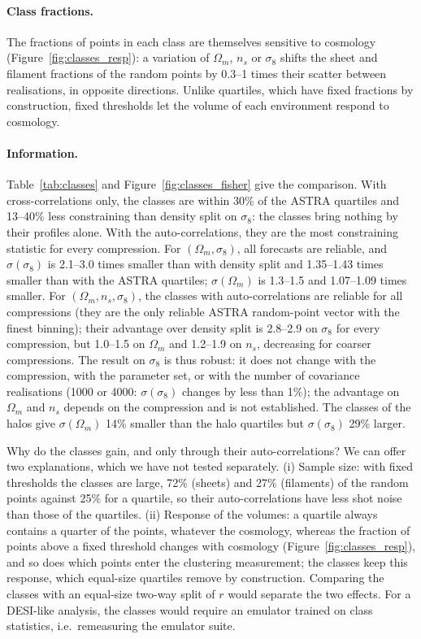 \paragraph{Class fractions.} The fractions of points in each class are themselves sensitive to cosmology (Figure~\ref{fig:classes_resp}): a variation of $\Omega_m$, $n_s$ or $\sigma_8$ shifts the sheet and filament fractions of the random points by 0.3--1 times their scatter between realisations, in opposite directions. Unlike quartiles, which have fixed fractions by construction, fixed thresholds let the volume of each environment respond to cosmology.

\paragraph{Information.} Table~\ref{tab:classes} and Figure~\ref{fig:classes_fisher} give the comparison. With cross-correlations only, the classes are within 30\% of the ASTRA quartiles and 13--40\% less constraining than density split on $\sigma_8$: the classes bring nothing by their profiles alone. With the auto-correlations, they are the most constraining statistic for every compression. For $(\Omega_m,\sigma_8)$, all forecasts are reliable, and $\sigma(\sigma_8)$ is 2.1--3.0 times smaller than with density split and 1.35--1.43 times smaller than with the ASTRA quartiles; $\sigma(\Omega_m)$ is 1.3--1.5 and 1.07--1.09 times smaller. For $(\Omega_m,n_s,\sigma_8)$, the classes with auto-correlations are reliable for all compressions (they are the only reliable ASTRA random-point vector with the finest binning); their advantage over density split is 2.8--2.9 on $\sigma_8$ for every compression, but 1.0--1.5 on $\Omega_m$ and 1.2--1.9 on $n_s$, decreasing for coarser compressions. The result on $\sigma_8$ is thus robust: it does not change with the compression, with the parameter set, or with the number of covariance realisations (1000 or 4000: $\sigma(\sigma_8)$ changes by less than 1\%); the advantage on $\Omega_m$ and $n_s$ depends on the compression and is not established. The classes of the halos give $\sigma(\Omega_m)$ 14\% smaller than the halo quartiles but $\sigma(\sigma_8)$ 29\% larger.

Why do the classes gain, and only through their auto-correlations? We can offer two explanations, which we have not tested separately. (i) Sample size: with fixed thresholds the classes are large, 72\% (sheets) and 27\% (filaments) of the random points against 25\% for a quartile, so their auto-correlations have less shot noise than those of the quartiles. (ii) Response of the volumes: a quartile always contains a quarter of the points, whatever the cosmology, whereas the fraction of points above a fixed threshold changes with cosmology (Figure~\ref{fig:classes_resp}), and so does which points enter the clustering measurement; the classes keep this response, which equal-size quartiles remove by construction. Comparing the classes with an equal-size two-way split of $r$ would separate the two effects. For a DESI-like analysis, the classes would require an emulator trained on class statistics, i.e.\ remeasuring the emulator suite.

